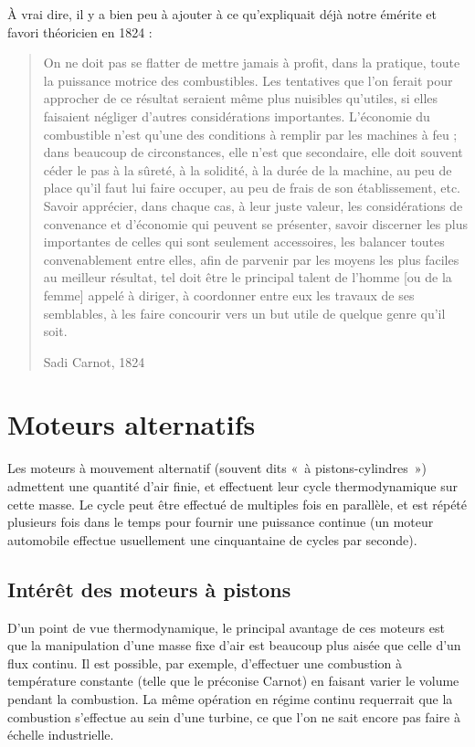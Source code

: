 		À vrai dire, il y a bien peu à ajouter à ce qu’expliquait déjà notre émérite et favori théoricien en 1824 :

		\begin{quote}
			On ne doit pas se flatter de mettre jamais à profit, dans la pratique, toute la puissance motrice des combustibles. Les tentatives que l’on ferait pour approcher de ce résultat seraient même plus nuisibles qu’utiles, si elles faisaient négliger d’autres considérations importantes. L’économie du combustible n’est qu’une des conditions à remplir par les machines à feu ; dans beaucoup de circonstances, elle n’est que secondaire, elle doit souvent céder le pas à la sûreté, à la solidité, à la durée de la machine, au peu de place qu’il faut lui faire occuper, au peu de frais de son établissement, etc. Savoir apprécier, dans chaque cas, à leur juste valeur, les considérations de convenance et d’économie qui peuvent se présenter, savoir discerner les plus importantes de celles qui sont seulement accessoires, les balancer toutes convenablement entre elles, afin de parvenir par les moyens les plus faciles au meilleur résultat, tel doit être le principal talent de l’homme [ou de la femme] appelé à diriger, à coordonner entre eux les travaux de ses semblables, à les faire concourir vers un but utile de quelque genre qu’il soit.
			\begin{flushright}
				Sadi Carnot, 1824~\cite{carnot1824}
			\end{flushright}
		\end{quote}



\section{Moteurs alternatifs}

Les moteurs à mouvement alternatif (souvent dits «~à pistons-cylindres~») admettent une quantité d’air finie, et effectuent leur cycle thermodynamique sur cette masse. Le cycle peut être effectué de multiples fois en parallèle, et est répété plusieurs fois dans le temps pour fournir une puissance continue (un moteur automobile effectue usuellement une cinquantaine de cycles par seconde).

	\subsection{Intérêt des moteurs à pistons}

		D’un point de vue thermodynamique, le principal avantage de ces moteurs est que la manipulation d’une masse fixe d’air est beaucoup plus aisée que celle d’un flux continu. Il est possible, par exemple, d’effectuer une combustion à température constante (telle que le préconise Carnot) en faisant varier le volume pendant la combustion. La même opération en régime continu requerrait que la combustion s’effectue au sein d’une turbine, ce que l’on ne sait encore pas faire à échelle industrielle.

